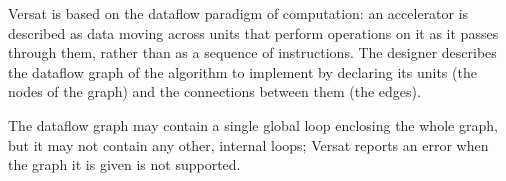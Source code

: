 %

Versat is based on the dataflow paradigm of computation: an accelerator is
described as data moving across units that perform operations on it as it
passes through them, rather than as a sequence of instructions. The
designer describes the dataflow graph of the algorithm to implement by
declaring its units (the nodes of the graph) and the connections between
them (the edges).

The dataflow graph may contain a single global loop enclosing the whole
graph, but it may not contain any other, internal loops; Versat reports an
error when the graph it is given is not supported.
